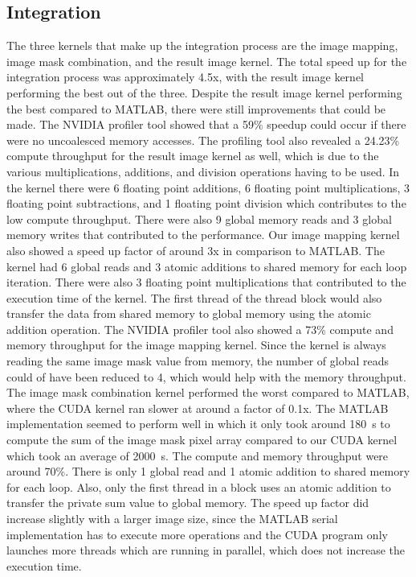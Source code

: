 \documentclass[conference]{IEEEtran}
\newcommand{\micro}{~\textmu}
\begin{document}
      \subsection{Integration}
         The three kernels that make up the integration process are the image mapping, image mask combination, and the result image kernel. The total speed up for the integration process was approximately 4.5x, with the result image kernel performing the best out of the three. Despite the result image kernel performing the best compared to MATLAB, there were still improvements that could be made. The NVIDIA profiler tool showed that a 59\% speedup could occur if there were no uncoalesced memory accesses. The profiling tool also revealed a 24.23\% compute throughput for the result image kernel as well, which is due to the various multiplications, additions, and division operations having to be used. In the kernel there were 6 floating point additions, 6 floating point multiplications, 3 floating point subtractions, and 1 floating point division which contributes to the low compute throughput. There were also 9 global memory reads and 3 global memory writes that contributed to the performance.
         Our image mapping kernel also showed a speed up factor of around 3x in comparison to MATLAB. The kernel had 6 global reads and 3 atomic additions to shared memory for each loop iteration. There were also 3 floating point multiplications that contributed to the execution time of the kernel. The first thread of the thread block would also transfer the data from shared memory to global memory using the atomic addition operation. The NVIDIA profiler tool also showed a 73\% compute and memory throughput for the image mapping kernel. Since the kernel is always reading the same image mask value from memory, the number of global reads could of have been reduced to 4, which would help with the memory throughput.
         The image mask combination kernel performed the worst compared to MATLAB, where the CUDA kernel ran slower at around a factor of 0.1x. The MATLAB implementation seemed to perform well in which it only took around 180\micro s to compute the sum of the image mask pixel array compared to our CUDA kernel which took an average of 2000\micro s. The compute and memory throughput were around 70\%. There is only 1 global read and 1 atomic addition to shared memory for each loop. Also, only the first thread in a block uses an atomic addition to transfer the private sum value to global memory. The speed up factor did increase slightly with a larger image size, since the MATLAB serial implementation has to execute more operations and the CUDA program only launches more threads which are running in parallel, which does not increase the execution time.
\end{document}
